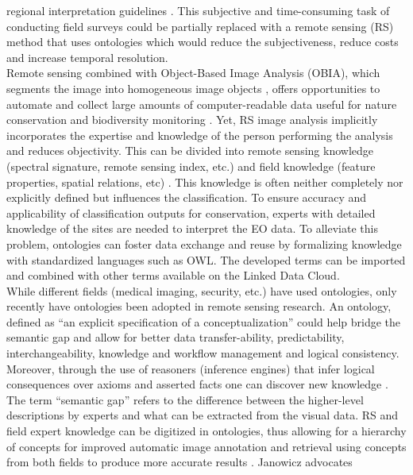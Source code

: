 \documentclass[authoryear, review,12pt,number]{elsarticle}
\begin{document}
regional interpretation guidelines \citep{INSPIREdataspecs}. This subjective
and time-consuming task of conducting field surveys could be partially replaced
with a remote sensing (RS) method that uses ontologies which would reduce the
subjectiveness, reduce costs and increase temporal resolution.
\\
Remote sensing combined with Object-Based Image Analysis (OBIA), which
segments the image into homogeneous image objects \citep{Blaschke2010}, offers
opportunities to automate and collect large amounts of computer-readable data
useful for nature conservation and biodiversity monitoring \citep{Corbane2015,
VandenBorre2011, Mayer2011}. Yet, RS image analysis implicitly incorporates the
expertise and knowledge of the person performing the analysis and reduces
objectivity. This can be divided into remote sensing knowledge (spectral
signature, remote sensing index, etc.) and field knowledge (feature properties,
spatial relations, etc) \citep{Andres2013a}. This knowledge is often neither
completely nor explicitly defined but influences the classification. To ensure
accuracy and applicability of classification outputs for conservation, experts
with detailed knowledge of the sites are needed to interpret the EO data. To
alleviate this problem, ontologies can foster data exchange and reuse by
formalizing knowledge with standardized languages such as OWL. The developed
terms can be imported and combined with other terms available on the Linked Data
Cloud.
\\
While different fields (medical imaging, security, etc.) have used ontologies,
only recently have ontologies been adopted in remote sensing research. An
ontology, defined as ``an explicit specification of a conceptualization''
\citep{gruber1993} could help bridge the semantic gap and allow for better data
transfer-ability, predictability, interchangeability, knowledge and workflow
management and logical consistency. Moreover, through the use of reasoners
(inference engines) that infer logical consequences over axioms and asserted 
facts one can discover new knowledge \citep{Arvor2013, Andres2013a}. The term
``semantic gap'' refers to the difference between the higher-level descriptions
by experts and what can be extracted from the visual data. RS and
field expert knowledge can be digitized in ontologies, thus allowing for a
hierarchy of concepts for improved automatic image annotation and retrieval
using concepts from both fields to produce more accurate results
\cite{Srikanth:2005:EOA:1076034.1076128}. Janowicz \cite{Janowicz2012} advocates
\end{document}
